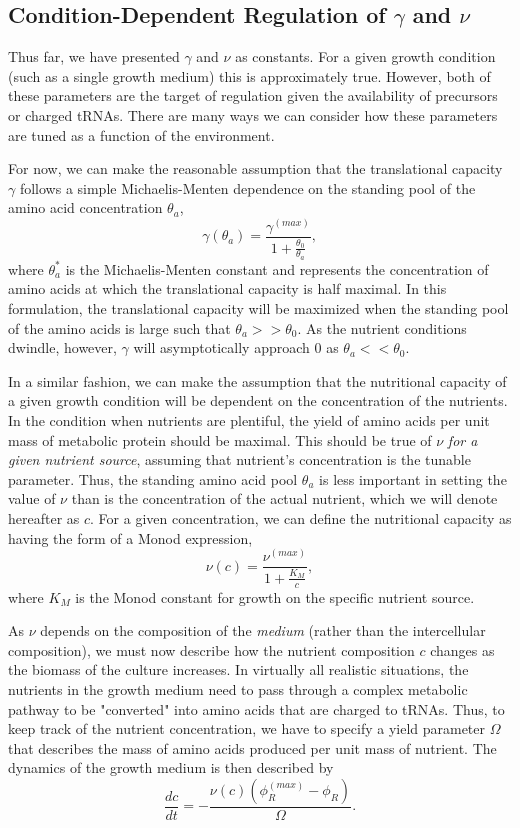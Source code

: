 \documentclass[letterpaper, 11pt]{article}
\begin{document}
\subsection{Condition-Dependent Regulation of $\gamma$ and $\nu$}
Thus far, we have presented $\gamma$ and $\nu$ as constants. For a given growth
condition (such as a single growth medium) this is approximately true. However,
both of these parameters are the target of regulation given the availability of
precursors or charged tRNAs. There are many ways we can consider how these
parameters are tuned as a function of the environment. 

For now, we can make the reasonable assumption that the translational
capacity $\gamma$ follows a simple Michaelis-Menten dependence on the
standing pool of the amino acid concentration $\theta_a$,
\begin{equation}
\gamma(\theta_a) = \frac{\gamma^{(max)}}{1 + \frac{\theta_0}{\theta_a}},
\label{eq:gamma_michaelis_menten}
\end{equation}
where $\theta_a^*$ is the Michaelis-Menten constant and represents the
concentration of amino acids at which the translational capacity is half
maximal. In this formulation, the translational capacity will be maximized when 
the standing pool of the amino acids is large such that $\theta_a >> \theta_0$.
As the nutrient conditions dwindle, however, $\gamma$ will asymptotically
approach $0$ as $\theta_a <<  \theta_0$.

In a similar fashion, we can make the assumption that the nutritional capacity 
of a given growth condition will be dependent on the concentration of the
nutrients. In the condition when nutrients are plentiful, the yield of amino
acids per unit mass of metabolic protein should be maximal. This should be true
of $\nu$ \textit{for a given nutrient source}, assuming that nutrient's
concentration is the tunable parameter. Thus, the standing amino acid pool
$\theta_a$ is less important in setting the value of $\nu$ than is the
concentration of the actual nutrient, which we will denote hereafter as $c$. For
a given concentration, we can define the nutritional capacity as having the form
of a Monod expression, 
\begin{equation}
\nu(c) = \frac{\nu^{(max)}}{1 + \frac{K_M}{c}},
\label{eq:nu_monod}
\end{equation}
where $K_M$ is the Monod constant for growth on the specific nutrient source. 

As $\nu$ depends on the composition of the \textit{medium} (rather than the
intercellular composition), we must now describe how the nutrient composition
$c$ changes as the biomass of the culture increases. In virtually all realistic 
situations, the nutrients in the growth medium need to pass through a complex 
metabolic pathway to be "converted" into amino acids that are charged to tRNAs.
Thus, to keep track of the nutrient concentration, we have to specify a yield
parameter $\Omega$ that describes the mass of amino acids produced per unit mass
of nutrient. The dynamics of the growth medium is then described by 
\begin{equation}
\frac{dc}{dt} = -\frac{\nu(c)\left(\phi_R^{(max)} - \phi_R\right)}{\Omega}.
\label{eq:dc_dt}
\end{equation}
\end{document}
